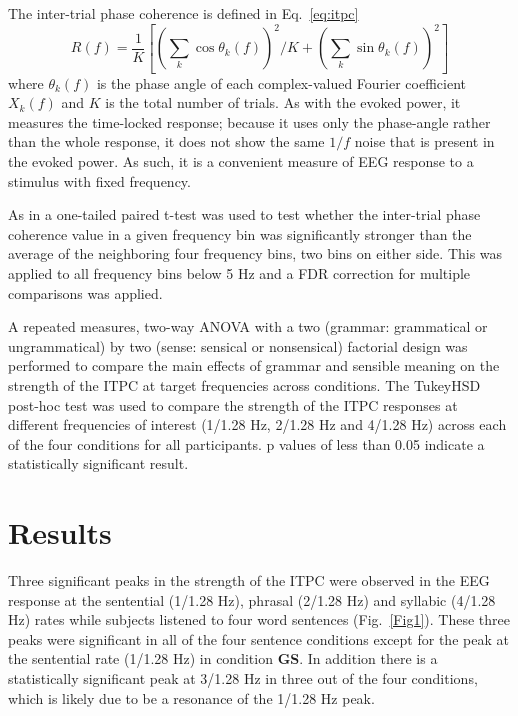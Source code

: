 \documentclass[10pt,letterpaper]{article}
\begin{document}
The inter-trial phase coherence is defined in Eq.~\ref{eq:itpc}
\begin{equation}
\label{eq:itpc}
R(f)=\frac{1}{K}\left[\left(\sum_k{\cos{\theta_k(f)}}\right)^2/K+\left(\sum_k{\sin{\theta_k(f)}}\right)^2\right]
\end{equation}
where $\theta_k(f)$ is the phase angle of each complex-valued Fourier coefficient $X_k(f)$ and $K$ is the total number of trials. As with the evoked power, it measures the time-locked response; because it uses only the phase-angle rather than the whole response, it does not show the same $1/f$ noise that is present in the evoked power. As such, it is a convenient measure of EEG response to a stimulus with fixed frequency.

As in \cite{DingEtAl2016} a one-tailed paired t-test was used to test whether the inter-trial phase coherence value in a given frequency bin was significantly stronger than the average of the neighboring four frequency bins, two bins on either side. This was applied to all frequency bins below 5 Hz and a FDR correction for multiple comparisons was applied. 

A repeated measures, two-way ANOVA with a two (grammar: grammatical or ungrammatical) by two (sense: sensical or nonsensical) factorial design was performed to compare the main effects of grammar and sensible meaning on the strength of the ITPC at target frequencies across conditions. The TukeyHSD post-hoc test was used to compare the strength of the ITPC responses at different frequencies of interest (1/1.28 Hz, 2/1.28 Hz and 4/1.28 Hz) across each of the four conditions for all participants. p values of less than 0.05 indicate a statistically significant result.


\section*{Results}

Three significant peaks in the strength of the ITPC were observed in the EEG response at the sentential (1/1.28 Hz), phrasal (2/1.28 Hz) and syllabic (4/1.28 Hz) rates while subjects listened to four word sentences (Fig.~\ref{Fig1}). These three peaks were significant in all of the four sentence conditions except for the peak at the sentential rate (1/1.28 Hz) in condition \textbf{GS}. In addition there is a statistically significant peak at 3/1.28 Hz in three out of the four conditions, which is likely due to be a resonance of the 1/1.28 Hz peak.
\end{document}
